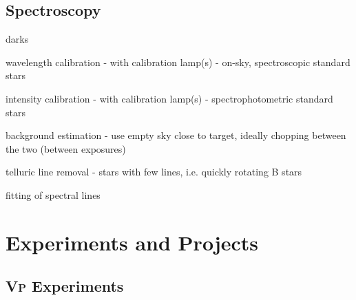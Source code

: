 \documentclass[a4paper, 11pt, fleqn]{memoir}
\begin{document}


\chapter{Spectroscopy}

darks

wavelength calibration - with calibration lamp(s) - on-sky, spectroscopic
standard stars

intensity calibration - with calibration lamp(s) - spectrophotometric standard
stars

background estimation - use empty sky close to target, ideally chopping between
the two (between exposures)

telluric line removal - stars with few lines, i.e. quickly rotating B stars

fitting of spectral lines

\part{Experiments and Projects}

\chapter{\textsc{Vp}
  Experiments}
\end{document}
